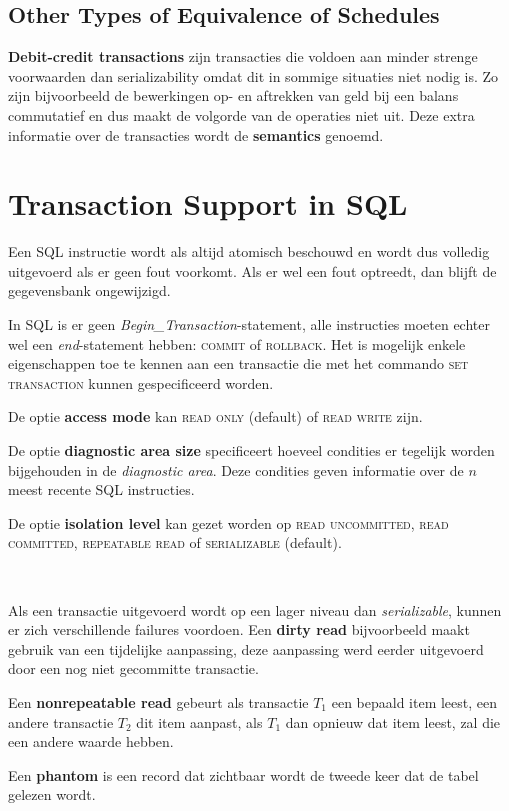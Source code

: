 \subsection{Other Types of Equivalence of Schedules}
\textbf{Debit-credit transactions} zijn transacties die voldoen aan minder strenge voorwaarden dan serializability omdat dit in sommige situaties niet nodig is. Zo zijn bijvoorbeeld de bewerkingen op- en aftrekken van geld bij een balans commutatief en dus maakt de volgorde van de operaties niet uit. Deze extra informatie over de transacties wordt de \textbf{semantics} genoemd.



\section{Transaction Support in SQL}
Een SQL instructie wordt als altijd atomisch beschouwd en wordt dus volledig uitgevoerd als er geen fout voorkomt. Als er wel een fout optreedt, dan blijft de gegevensbank ongewijzigd.

In SQL is er geen \textit{Begin\_Transaction}-statement, alle instructies moeten echter wel een \textit{end}-statement hebben: \textsc{commit} of \textsc{rollback}. Het is mogelijk enkele eigenschappen toe te kennen aan een transactie die met het commando \textsc{set transaction} kunnen gespecificeerd worden.

De optie \textbf{access mode} kan \textsc{read only} (default) of \textsc{read write} zijn.

De optie \textbf{diagnostic area size} specificeert hoeveel condities er tegelijk worden bijgehouden in de \textit{diagnostic area}. Deze condities geven informatie over de $n$ meest recente SQL instructies.

De optie \textbf{isolation level} kan gezet worden op \textsc{read uncommitted}, \textsc{read committed}, \textsc{repeatable read} of \textsc{serializable} (default).

~

\noindent Als een transactie uitgevoerd wordt op een lager niveau dan \textit{serializable}, kunnen er zich verschillende failures voordoen. Een \textbf{dirty read} bijvoorbeeld maakt gebruik van een tijdelijke aanpassing, deze aanpassing werd eerder uitgevoerd door een nog niet gecommitte transactie.

Een \textbf{nonrepeatable read} gebeurt als transactie $T_1$ een bepaald item leest, een andere transactie $T_2$ dit item aanpast, als $T_1$ dan opnieuw dat item leest, zal die een andere waarde hebben.

Een \textbf{phantom} is een record dat zichtbaar wordt de tweede keer dat de tabel gelezen wordt.